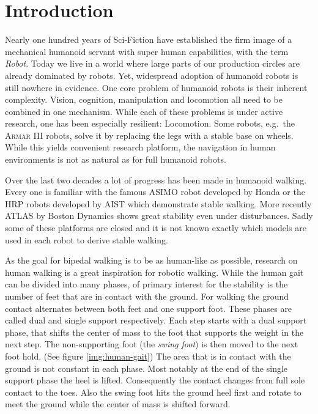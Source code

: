 \documentclass[english,ngerman]{KITreprt}
\newcommand{\name}[1]{\textsc{#1}}
\begin{document}



\maketitle

\tableofcontents

\chapter{Introduction}\label{introduction}

Nearly one hundred years of Sci-Fiction have established the firm image
of a mechanical humanoid servant with super human capabilities, with the
term \emph{Robot}. Today we live in a world where large parts of our
production circles are already dominated by robots. Yet, widespread
adoption of humanoid robots is still nowhere in evidence. One core
problem of humanoid robots is their inherent complexity. Vision,
cognition, manipulation and locomotion all need to be combined in one
mechanism. While each of these problems is under active research, one
has been especially resilient: Locomotion. Some robots, e.g.~the
\name{Armar III} robots, solve it by replacing the legs with a stable
base on wheels. While this yields convenient research platform, the
navigation in human environments is not as natural as for full humanoid
robots.

Over the last two decades a lot of progress has been made in humanoid
walking. Every one is familiar with the famous \name{ASIMO} robot
developed by Honda or the HRP robots developed by AIST which demonstrate
stable walking. More recently \name{ATLAS} by Boston Dynamics shows
great stability even under disturbances. Sadly some of these platforms
are closed and it is not known exactly which models are used in each
robot to derive stable walking.

As the goal for bipedal walking is to be as human-like as possible,
research on human walking is a great inspiration for robotic walking.
While the human gait can be divided into many phases, of primary
interest for the stability is the number of feet that are in contact
with the ground. For walking the ground contact alternates between both
feet and one support foot. These phases are called dual and single
support respectively. Each step starts with a dual support phase, that
shifts the center of mass to the foot that supports the weight in the
next step. The non-supporting foot (the \emph{swing foot}) is then moved
to the next foot hold. (See figure \ref{img:human-gait}) The area that
is in contact with the ground is not constant in each phase. Most
notably at the end of the single support phase the heel is lifted.
Consequently the contact changes from full sole contact to the toes.
Also the swing foot hits the ground heel first and rotate to meet the
ground while the center of mass is shifted forward.
\end{document}
